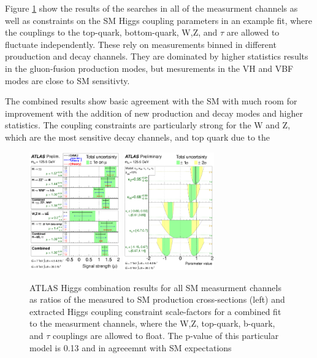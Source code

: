 Figure \ref{figure:theory_higgsdisc} show the results of the searches in all of the
measurment channels as well as constraints on the SM Higgs coupling parameters in 
an example fit, where the couplings to the top-quark, bottom-quark, W,Z, and $\tau$
are allowed to fluctuate independently. These rely on measurements binned in different
prouduction and decay channels. They are dominated by higher statistics results in the 
gluon-fusion production modes, but mesurements in the VH and VBF modes are close to 
SM sensitivty. 

The combined results show basic agreement with the SM with much room for improvement
with the addition of new production and decay modes and higher statistics. The 
coupling constraints are particularly strong for the W and Z, which are
the most sensitive decay channels, and top quark due to the 


\begin{figure}[!t]
\centering 
\includegraphics[width=0.35\textwidth]{figs/atlas_higgs.pdf}
\includegraphics[width=0.35\textwidth]{figs/atlas_coupling.pdf}
\caption {
  ATLAS Higgs combination results for all SM measurment channels as ratios of
  the measured to SM production cross-sections (left) and extracted Higgs
  coupling constraint scale-factors for a combined fit to the measurment
  channels, where the W,Z, top-quark, b-quark, and $\tau$ couplings are
  allowed to float. The p-value of this particular model is 0.13 and in agreeemnt
  with SM expectations}

\label{figure:theory_higgsdisc}
\end{figure}


